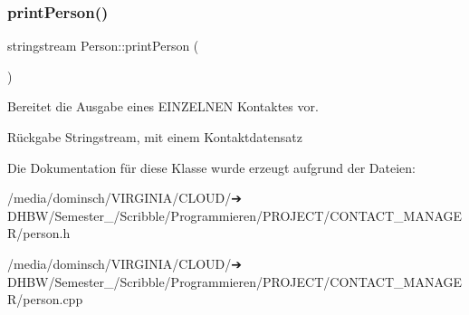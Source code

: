 \subsubsection{\texorpdfstring{print\+Person()}{printPerson()}}
{\footnotesize\ttfamily stringstream Person\+::print\+Person (\begin{DoxyParamCaption}{ }\end{DoxyParamCaption})}



Bereitet die Ausgabe eines E\+I\+N\+Z\+E\+L\+N\+EN Kontaktes vor.

\begin{DoxyReturn}{Rückgabe}
Stringstream, mit einem Kontaktdatensatz
\end{DoxyReturn}


Die Dokumentation für diese Klasse wurde erzeugt aufgrund der Dateien\+:\begin{DoxyCompactItemize}
\item 
/media/dominsch/\+V\+I\+R\+G\+I\+N\+I\+A/\+C\+L\+O\+U\+D/➔ D\+H\+B\+W/\+Semester\+\_/\+Scribble/\+Programmieren/\+P\+R\+O\+J\+E\+C\+T/\+C\+O\+N\+T\+A\+C\+T\+\_\+\+M\+A\+N\+A\+G\+E\+R/person.\+h\item 
/media/dominsch/\+V\+I\+R\+G\+I\+N\+I\+A/\+C\+L\+O\+U\+D/➔ D\+H\+B\+W/\+Semester\+\_/\+Scribble/\+Programmieren/\+P\+R\+O\+J\+E\+C\+T/\+C\+O\+N\+T\+A\+C\+T\+\_\+\+M\+A\+N\+A\+G\+E\+R/person.\+cpp\end{DoxyCompactItemize}

